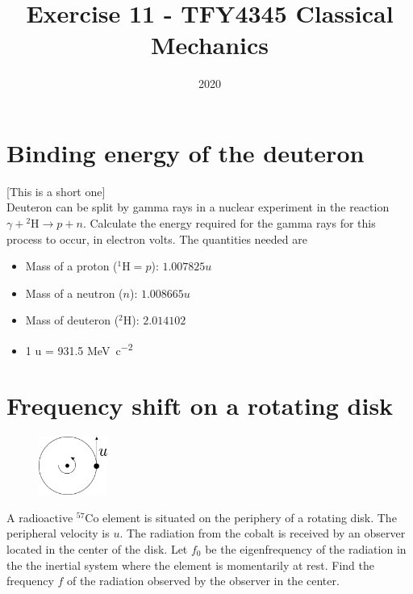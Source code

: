 \documentclass{article}
\title{Exercise 11 - TFY4345 Classical Mechanics}
\date{2020}
\begin{document}
    \maketitle
    \section{Binding energy of the deuteron}
    [This is a short one] \\
    Deuteron can be split by gamma rays in a nuclear experiment in the reaction $\gamma + {^2\mathrm{H}} \rightarrow p + n$. Calculate the energy required for the gamma rays for this process to occur, in electron volts. The quantities needed are
    \begin{itemize}
        \item Mass of a proton ($^1\mathrm{H} = p$): $1.007825 \si{u}$
        \item Mass of a neutron ($n$): $1.008665 \si{u}$
        \item Mass of deuteron ($^2 \mathrm{H}$): $2.014102$
        \item 1 \si{u} = 931.5 \si{MeV c^{-2}}
    \end{itemize}

    \section{Frequency shift on a rotating disk}
    \begin{figure}
        \vspace{-1cm}
        \includegraphics[width=0.2\textwidth]{figures/figure_1.pdf}
        \vspace{-1cm}
    \end{figure}
    A radioactive $^{57}\mathrm{Co}$ element is situated on the periphery of a rotating disk. The peripheral velocity is $u$. The radiation from the cobalt is received by an observer located in the center of the disk. Let $f_0$ be the eigenfrequency of the radiation in the the inertial system where the element is momentarily at rest. Find the frequency $f$ of the radiation observed by the observer in the center.
    
\end{document}
